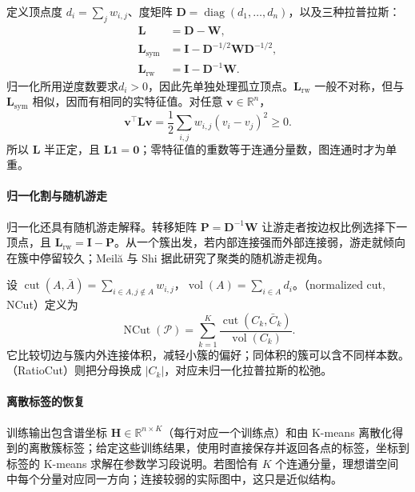定义顶点度 $d_i=\sum_jw_{i,j}$、度矩阵 $\bm{D}=\operatorname{diag}(d_1,\ldots,d_n)$，以及三种拉普拉斯：
\begin{align}
 \bm{L}&=\bm{D}-\bm{W},\nonumber\\
 \bm{L}_{\mathrm{sym}}
 &=\bm{I}-\bm{D}^{-1/2}\bm{W}\bm{D}^{-1/2},\nonumber\\
 \bm{L}_{\mathrm{rw}}
 &=\bm{I}-\bm{D}^{-1}\bm{W}.
 \label{eq:clustering-laplacians}
\end{align}
归一化所用逆度数要求$d_i>0$，因此先单独处理孤立顶点。$\bm{L}_{\mathrm{rw}}$ 一般不对称，但与 $\bm{L}_{\mathrm{sym}}$ 相似，因而有相同的实特征值。对任意 $\bm{v}\in\mathbb{R}^n$，
\begin{equation}
 \bm{v}^{\top}\bm{L}\bm{v}
 =\frac12\sum_{i,j}w_{i,j}(v_i-v_j)^2\geq0.
 \label{eq:clustering-laplacian-form}
\end{equation}
所以 $\bm{L}$ 半正定，且 $\bm{L}\bm{1}=\bm{0}$；零特征值的重数等于连通分量数，图连通时才为单重。

\paragraph{归一化割与随机游走}

归一化还具有随机游走解释。转移矩阵 $\bm{P}=\bm{D}^{-1}\bm{W}$ 让游走者按边权比例选择下一顶点，且 $\bm{L}_{\mathrm{rw}}=\bm{I}-\bm{P}$。从一个簇出发，若内部连接强而外部连接弱，游走就倾向在簇中停留较久；Meilă 与 Shi 据此研究了聚类的随机游走视角。

设 $\operatorname{cut}(A,\bar A)=\sum_{i\in A,j\notin A}w_{i,j}$，$\operatorname{vol}(A)=\sum_{i\in A}d_i$。（normalized cut, NCut）定义为
\begin{equation}
 \operatorname{NCut}(\mathcal{P})
 =\sum_{k=1}^K
 \frac{\operatorname{cut}(C_k,\bar C_k)}
      {\operatorname{vol}(C_k)}.
 \label{eq:clustering-ncut}
\end{equation}
它比较切边与簇内外连接体积，减轻小簇的偏好；同体积的簇可以含不同样本数。（RatioCut）则把分母换成 $|C_k|$，对应未归一化拉普拉斯的松弛。

\paragraph{离散标签的恢复}

训练输出包含谱坐标 $\bm{H}\in\mathbb{R}^{n\times K}$（每行对应一个训练点）和由 K-means 离散化得到的离散簇标签；给定这些训练结果，使用时直接保存并返回各点的标签，坐标到标签的 K-means 求解在参数学习段说明。若图恰有 $K$ 个连通分量，理想谱空间中每个分量对应同一方向；连接较弱的实际图中，这只是近似结构。

